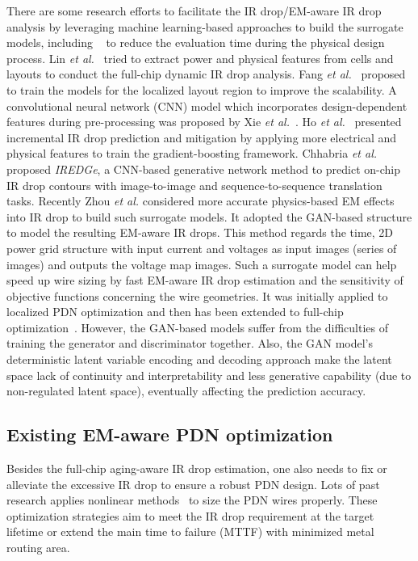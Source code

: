 There are some research efforts to facilitate the IR drop/EM-aware IR drop analysis by leveraging machine learning-based approaches to build the surrogate models, including ~\cite{LinFang:2018vts,Fang:2018dynireco,HoKahng:ICCAD'19,Xie:2020powernet,Sachin:ASPDAC'21} to reduce the evaluation time during the physical design process.  Lin {\it et al.}~\cite{LinFang:2018vts} tried to extract power and physical features from cells and layouts to conduct the full-chip dynamic IR drop analysis. Fang {\it et al.}~\cite{Fang:2018dynireco} proposed to train the models for the localized layout region to improve the scalability.  A convolutional neural network (CNN) model which incorporates design-dependent features during pre-processing was proposed by Xie {\it et al.}~\cite{Xie:2020powernet}. Ho {\it et al.}~\cite{HoKahng:ICCAD'19} presented incremental IR drop prediction and mitigation by applying more electrical and physical features to train the gradient-boosting framework. Chhabria {\it et al.}~\cite{Sachin:ASPDAC'21} proposed {\it IREDGe}, a CNN-based generative network method to predict on-chip IR drop contours with image-to-image and sequence-to-sequence translation tasks.
Recently Zhou {\it et al.} \cite{ZhouJin:ICCAD'20} considered more accurate physics-based EM effects into IR drop to build such surrogate models. It adopted the GAN-based structure to model the resulting EM-aware IR drops.  This method regards the time, 2D power grid structure with input current and voltages as input images (series of images) and outputs the voltage map images. Such a surrogate model can help speed up wire sizing by fast EM-aware IR drop estimation and the sensitivity of objective functions concerning the wire geometries. It was initially applied to localized PDN optimization and then has been extended to full-chip optimization~\cite{HanLiu:TCAD'22-23}.
However, the GAN-based models suffer from the difficulties of training the generator and discriminator together. Also, the GAN model's deterministic latent variable encoding and decoding approach make the latent space lack of continuity and interpretability and less generative capability (due to non-regulated latent space), eventually affecting the prediction accuracy.


\subsection{Existing EM-aware PDN optimization}
 \label{subsec:exist_pgfix}
Besides the full-chip aging-aware IR drop estimation, one also needs to fix or alleviate the excessive IR drop to ensure a robust PDN design. Lots of past research applies nonlinear methods~\cite{ChBr:TCAD'88,DuMa:DAC'89,Tan:DAC'99,Wang:TCAD'05,ZhouSun:TVLSI'19, Sukharev:2019pg} to size the PDN wires properly. These optimization strategies aim to meet the IR drop requirement at the target lifetime or extend the main time to failure (MTTF) with minimized metal routing area.

